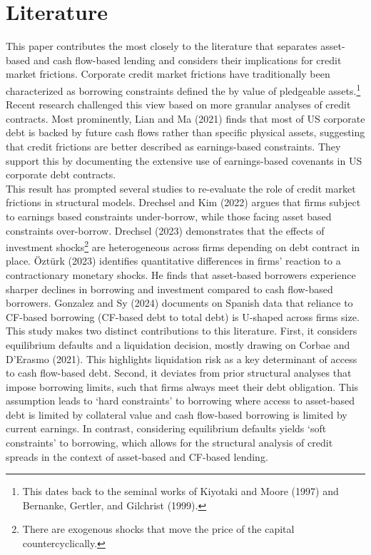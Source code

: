 \documentclass[12pt]{article}
\begin{document}
\section{Literature \label{sec:literature}} 
This paper contributes the most closely to the literature that separates asset-based and cash flow-based lending and considers their implications for credit market frictions. Corporate credit market frictions have traditionally been characterized as borrowing constraints defined the by value of pledgeable assets.\footnote{This dates back to the seminal works of Kiyotaki and Moore (1997) and Bernanke, Gertler, and Gilchrist (1999).} Recent research challenged this view based on more granular analyses of credit contracts. Most prominently, Lian and Ma (2021) finds that most of US corporate debt is backed by future cash flows rather than specific physical assets, suggesting that credit frictions are better described as earnings-based constraints. They support this by documenting the extensive use of earnings-based covenants in US corporate debt contracts. \vspace{3mm} \\
This result has prompted several studies to re-evaluate the role of credit market frictions in structural models. Drechsel and Kim (2022) argues that firms subject to earnings based constraints under-borrow, while those facing asset based constraints over-borrow. Drechsel (2023) demonstrates that the effects of investment shocks\footnote{There are exogenous shocks that move the price of the capital countercyclically.} are heterogeneous across firms depending on debt contract in place. Öztürk (2023) identifies quantitative differences in firms' reaction to a contractionary monetary shocks. He finds that asset-based borrowers experience sharper declines in borrowing and investment compared to cash flow-based borrowers. Gonzalez and Sy (2024) documents on Spanish data that reliance to CF-based borrowing (CF-based debt to total debt) is U-shaped across firms size. \vspace{3mm} \\
This study makes two distinct contributions to this literature. First, it considers equilibrium defaults and a liquidation decision, mostly drawing on Corbae and D'Erasmo (2021). This highlights liquidation risk as a key determinant of access to cash flow-based debt. Second, it deviates from prior structural analyses that impose borrowing limits, such that firms always meet their debt obligation. This assumption leads to `hard constraints' to borrowing where access to asset-based debt is limited by collateral value and cash flow-based borrowing is limited by current earnings. In contrast, considering equilibrium defaults yields `soft constraints' to borrowing, which  allows for the structural analysis of credit spreads in the context of asset-based and CF-based lending. \vspace{3mm} \\
\end{document}
